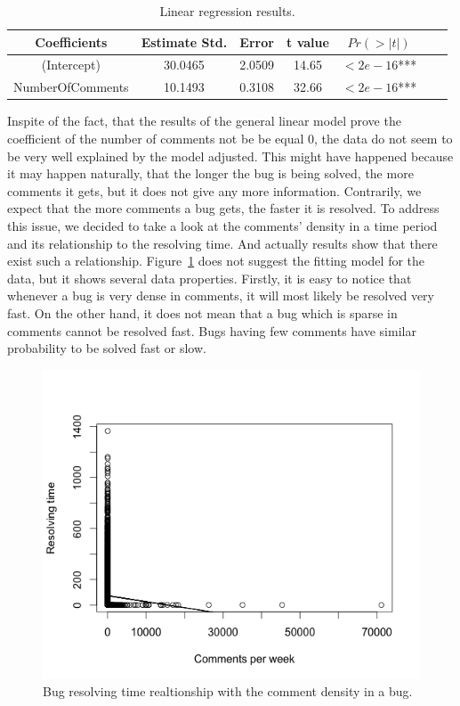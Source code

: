 \documentclass[a4paper,11pt]{report}
\begin{document}
\begin{table}[ht!]
\centering
\begin{tabular}{|c|c|c|c|c|c|c|}
\hline
Coefficients & Estimate Std. & Error & t value & {$Pr(>|t|)$}\tabularnewline
\hline
\hline
(Intercept) & 30.0465 & 2.0509 & 14.65 & {$<2e-16 $}***\tabularnewline
\hline
NumberOfComments & 10.1493 & 0.3108 & 32.66 & {$<2e-16$}***\tabularnewline
\hline
\end{tabular}
\caption{Linear regression results.}
\label{tbl:glm}
\end{table}

Inspite of the fact, that the results of the general linear model prove the coefficient of the number of comments not be be equal 0, the data do not seem to be very well explained by the model adjusted. This might have happened because it may happen naturally, that the longer the bug is being solved, the more comments it gets, but it does not give any more information. Contrarily, we expect that the more comments a bug gets, the faster it is resolved. To address this issue, we decided to take a look at the comments' density in a time period and its relationship to the resolving time. And actually results show that there exist such a relationship. Figure~\ref{fig:density_time} does not suggest the fitting model for the data, but it shows several data properties. Firstly, it is easy to notice that whenever a bug is very dense in comments, it will most likely be resolved very fast. On the other hand, it does not mean that a bug which is sparse in comments cannot be resolved fast. Bugs having few comments have similar probability to be solved fast or slow.

\begin{figure}[ht!]
\centering
\includegraphics[width=.7\textwidth]{density_time.png}
\caption{Bug resolving time realtionship with the comment density in a bug.}
\label{fig:density_time}
\end{figure}
\end{document}

